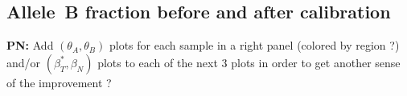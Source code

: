 \documentclass[10pt]{bmc_article}
\newenvironment{bmcformat}{\fussy\setboolean{publ}{true}}{\fussy}
\newenvironment{PN}{\color{blue}\textbf{PN:}}{}
\begin{document}
\begin{bmcformat}
\subsection*{Allele~B fraction before and after calibration}

\begin{PN}
  Add $(\theta_A, \theta_B)$ plots for each sample in a right panel (colored by region ?) and/or $(\beta_T^*, \beta_N)$ plots to each of the next 3 plots in order to get another sense of the improvement ?
\end{PN}

\begin{center}
%
 \label{figROCs,chr05}
\end{center}
% 

\begin{center}
\label{figROCs,chr06}
\end{center}



\end{bmcformat}
\end{document}
